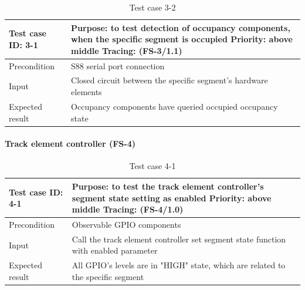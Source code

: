 \begin{table}[H]
	\caption{Test case 3-2}
	\label{table:TCase-FS3-2}
	\begin{center}
		\renewcommand{\arraystretch}{1.8}
		\begin{tabu} 
			to 0.9 \textwidth
			{  X[0.4, c] X[c] }
			\toprule
			Test case ID: 3-1 & Purpose: to test detection of occupancy components, when the specific segment is occupied \newline Priority: above middle \newline Tracing: (FS-3/1.1)\\ \midrule
			Precondition & S88 serial port connection  \\
			Input & Closed circuit between the specific segment's hardware elements  \\
			Expected result & Occupancy components have queried occupied occupancy state \\ \bottomrule
		\end{tabu}
	\end{center}
\end{table} 

\paragraph{Track element controller (FS-4)}
\begin{table}[H]
	\caption{Test case 4-1}
	\label{table:TCase-FS4-1}
	\begin{center}
		\renewcommand{\arraystretch}{1.8}
		\begin{tabu} 
			to 0.9 \textwidth
			{  X[0.4, c] X[c] }
			\toprule
			Test case ID: 4-1 & Purpose: to test the track element controller's segment state setting as enabled \newline Priority: above middle \newline Tracing: (FS-4/1.0)\\ \midrule
			Precondition & Observable GPIO components \\
			Input & Call the track element controller set segment state function with enabled parameter  \\
			Expected result & All GPIO's levels are in "HIGH" state, which are related to the specific segment \\ \bottomrule
		\end{tabu}
	\end{center}
\end{table}

